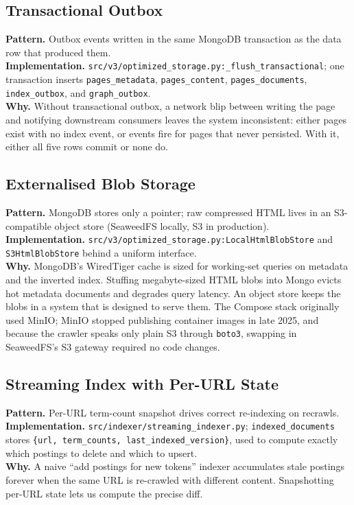 \documentclass[11pt,a4paper]{article}
\newcommand{\code}[1]{\texttt{#1}}
\begin{document}
\subsection{Transactional Outbox}

\textbf{Pattern.} Outbox events written in the same MongoDB transaction as the data row that produced them.\\
\textbf{Implementation.} \code{src/v3/optimized\_storage.py:\_flush\_transactional}; one transaction inserts \code{pages\_metadata}, \code{pages\_content}, \code{pages\_documents}, \code{index\_outbox}, and \code{graph\_outbox}.\\
\textbf{Why.} Without transactional outbox, a network blip between writing the page and notifying downstream consumers leaves the system inconsistent: either pages exist with no index event, or events fire for pages that never persisted. With it, either all five rows commit or none do.

\subsection{Externalised Blob Storage}

\textbf{Pattern.} MongoDB stores only a pointer; raw compressed HTML lives in an S3-compatible object store (SeaweedFS locally, S3 in production).\\
\textbf{Implementation.} \code{src/v3/optimized\_storage.py:LocalHtmlBlobStore} and \code{S3HtmlBlobStore} behind a uniform interface.\\
\textbf{Why.} MongoDB's WiredTiger cache is sized for working-set queries on metadata and the inverted index. Stuffing megabyte-sized HTML blobs into Mongo evicts hot metadata documents and degrades query latency. An object store keeps the blobs in a system that is designed to serve them. The Compose stack originally used MinIO; MinIO stopped publishing container images in late 2025, and because the crawler speaks only plain S3 through \code{boto3}, swapping in SeaweedFS's S3 gateway required no code changes.

\subsection{Streaming Index with Per-URL State}

\textbf{Pattern.} Per-URL term-count snapshot drives correct re-indexing on recrawls.\\
\textbf{Implementation.} \code{src/indexer/streaming\_indexer.py}; \code{indexed\_documents} stores \code{\{url, term\_counts, last\_indexed\_version\}}, used to compute exactly which postings to delete and which to upsert.\\
\textbf{Why.} A naive ``add postings for new tokens'' indexer accumulates stale postings forever when the same URL is re-crawled with different content. Snapshotting per-URL state lets us compute the precise diff.
\end{document}
